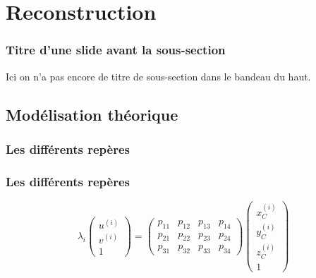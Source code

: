 \section[Reconstruction]{Reconstruction}
\begin{frame}
\frametitle{Titre d'une slide avant la sous-section}
    Ici on n'a pas encore de titre de sous-section dans le bandeau du haut.
    \label{slides_hors_subsec}
\end{frame}

\subsection{Modélisation théorique}
\begin{frame}
\frametitle{Les différents repères}
  \begin{minipage}{0.58\textwidth}
        \scalebox{0.65}{}
  \end{minipage}
\end{frame}
\begin{frame}
\frametitle{Les différents repères}
\[
\lambda_i \begin{pmatrix}
u^{(i)} \\
v^{(i)} \\
1
\end{pmatrix}
=
\begin{pmatrix}
p_{11} & p_{12} & p_{13} & p_{14} \\
p_{21} & p_{22} & p_{23} & p_{24} \\
p_{31} & p_{32} & p_{33} & p_{34}
\end{pmatrix}
\begin{pmatrix}
x_C^{(i)} \\
y_C^{(i)} \\
z_C^{(i)} \\
1
\end{pmatrix}
\]
\end{frame}
